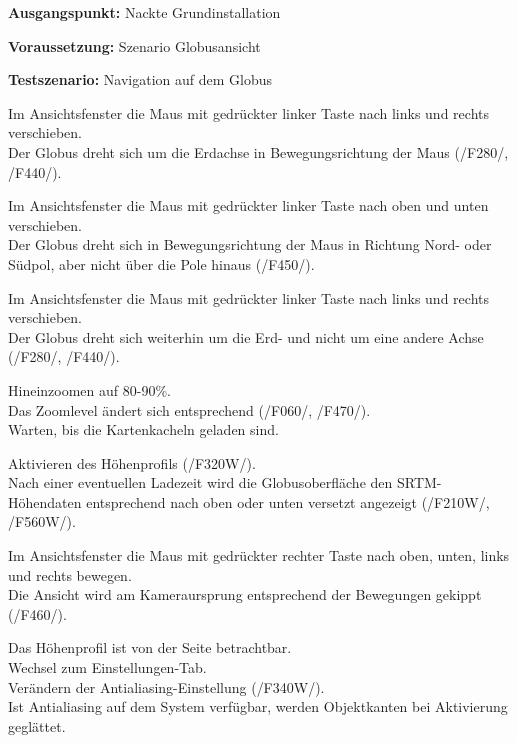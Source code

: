 \documentclass[10pt]{scrreprt}
\newcommand{\sfbf}[1]{\textbf{\sffamily #1}}
\newcommand{\ziel}[1]{{\fontsize{9.5}{11}\textsf{/#1/}}}
\newcommand{\ziellabel}{Z}
\newcommand{\muss}{\renewcommand{\labelenumi}{\textbf{\ziel{\ziellabel\numprint{\theenumi}0}}}}
\newcommand{\wunsch}{\renewcommand{\labelenumi}{\textbf{\ziel{\ziellabel\numprint{\theenumi}0W}}}}
\newenvironment{details}[1][6pt]{%
  \parskip#1 \parindent6mm \raggedright%
  \def\item{\par\ignorespaces\hangindent=5mm \hangafter1}}{%
  \par\ignorespaces}
\begin{document}
\vspace{1.0cm}
\begin{details}[2pt]
\item \sfbf{Ausgangspunkt:} Nackte Grundinstallation 
\item \sfbf{Voraussetzung:} Szenario Globusansicht
\item \sfbf{Testszenario:} Navigation auf dem Globus
\end{details}
\vspace{2mm}
\begin{enumerate}[leftmargin = 2.2cm, resume]
\item Im Ansichtsfenster die Maus mit gedrückter linker Taste nach links und rechts verschieben.\\Der Globus dreht sich um die Erdachse in Bewegungsrichtung der Maus (\ziel{F280}, \ziel{F440}).
\item Im Ansichtsfenster die Maus mit gedrückter linker Taste nach oben und unten verschieben.\\Der Globus dreht sich in Bewegungsrichtung der Maus in Richtung Nord- oder Südpol, aber nicht über die Pole hinaus (\ziel{F450}).
\item Im Ansichtsfenster die Maus mit gedrückter linker Taste nach links und rechts verschieben.\\Der Globus dreht sich weiterhin um die Erd- und nicht um eine andere Achse (\ziel{F280}, \ziel{F440}).
\item Hineinzoomen auf 80-90\%.\\Das Zoomlevel ändert sich entsprechend (\ziel{F060}, \ziel{F470}).\\Warten, bis die Kartenkacheln geladen sind.
\wunsch
\item Aktivieren des Höhenprofils (\ziel{F320W}).\\Nach einer eventuellen Ladezeit wird die Globusoberfläche den SRTM-Höhendaten entsprechend nach oben oder unten versetzt angezeigt (\ziel{F210W}, \ziel{F560W}).
\muss
\item Im Ansichtsfenster die Maus mit gedrückter rechter Taste nach oben, unten, links und rechts bewegen.\\Die Ansicht wird am Kameraursprung entsprechend der Bewegungen gekippt (\ziel{F460}).
\wunsch
\item Das Höhenprofil ist von der Seite betrachtbar.\\Wechsel zum Einstellungen-Tab.\\Verändern der Antialiasing-Einstellung (\ziel{F340W}).\\Ist Antialiasing auf dem System verfügbar, werden Objektkanten bei Aktivierung geglättet.

\end{enumerate}
\end{document}
